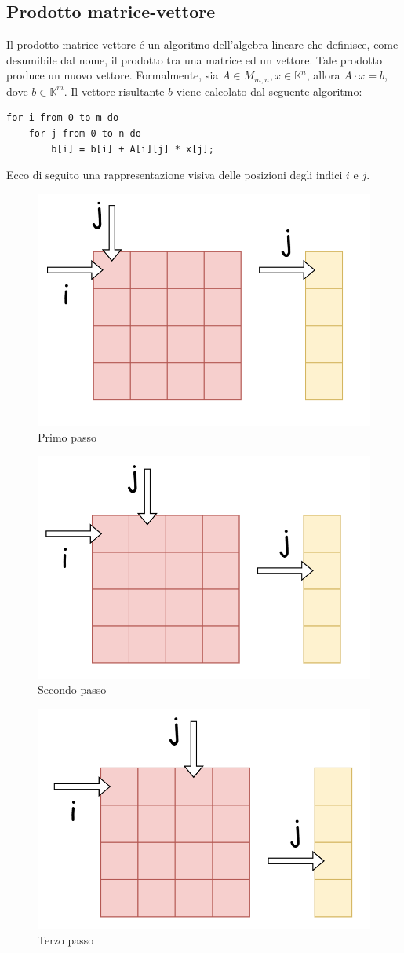 \subsection{Prodotto matrice-vettore}
Il prodotto matrice-vettore é un algoritmo dell'algebra lineare che definisce, come desumibile dal nome, il prodotto tra una matrice ed un vettore. Tale prodotto produce un nuovo vettore.
Formalmente, sia $A \in M_{m,n}, x \in \mathbb{K}^n$, allora $A\cdot x = b$, dove $b \in \mathbb{K}^m$.
Il vettore risultante $b$ viene calcolato dal seguente algoritmo:
\begin{lstlisting}
for i from 0 to m do
    for j from 0 to n do
        b[i] = b[i] + A[i][j] * x[j];
\end{lstlisting}
Ecco di seguito una rappresentazione visiva delle posizioni degli indici $i$ e $j$.
\begin{figure}[h]
    \centering
    \includegraphics[width=0.4\linewidth]{PrimaItr.png}
    \caption{Primo passo}
    \label{fig:enter-label}    
\end{figure}
\begin{figure}[h]
    \centering
    \includegraphics[width=0.4\linewidth]{SecondaItr.png}
    \caption{Secondo passo}
    \label{fig:enter-label}    
\end{figure}
\begin{figure}[h]
    \centering
    \includegraphics[width=0.4\linewidth]{Terza.png}
    \caption{Terzo passo}
    \label{fig:enter-label}    
\end{figure}

